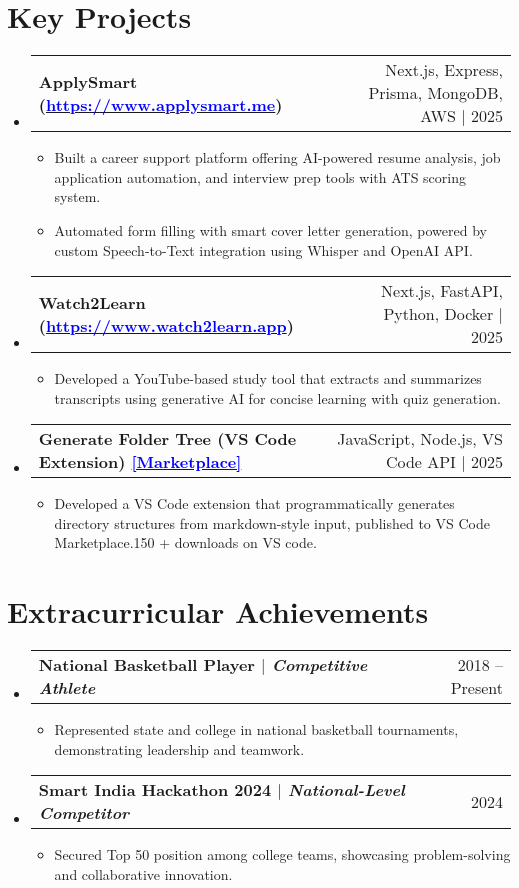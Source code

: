 \documentclass[letterpaper,11pt]{article}
\makeatletter
\newcommand{\resumeItem}[1]{\item\small{#1 \vspace{-3pt}}}
\newcommand{\resumeProjectHeading}[2]{
  \item
  \begin{tabular*}{0.98\textwidth}{l@{\extracolsep{\fill}}r}
    \small\bfseries#1 & \small#2 \\
  \end{tabular*}\vspace{-6pt}
}
\newcommand{\resumeProjectHeadingWithLink}[3]{
  \item
  \begin{tabular*}{0.98\textwidth}{l@{\extracolsep{\fill}}r}
    \small\bfseries#1 (\href{#2}{\textcolor{blue}{#2}}) & \small#3 \\
  \end{tabular*}\vspace{-6pt}
}
\newcommand{\resumeSubHeadingListStart}{\begin{itemize}[leftmargin=0.1in, label={}]}
\newcommand{\resumeSubHeadingListEnd}{\end{itemize}\vspace{-6pt}}
\newcommand{\resumeItemListStart}{\begin{itemize}}
\newcommand{\resumeItemListEnd}{\end{itemize}\vspace{-6pt}}
\makeatother
\begin{document}
\section{Key Projects}
\vspace{-2pt}
\resumeSubHeadingListStart
  \resumeProjectHeadingWithLink{\textbf{ApplySmart}}{https://www.applysmart.me}{Next.js, Express, Prisma, MongoDB, AWS $|$ 2025}
  \resumeItemListStart
    \resumeItem{Built a career support platform offering AI-powered resume analysis, job application automation, and interview prep tools with ATS scoring system.}
    \resumeItem{Automated form filling with smart cover letter generation, powered by custom Speech-to-Text integration using Whisper and OpenAI API.}
  \resumeItemListEnd

  \resumeProjectHeadingWithLink{\textbf{Watch2Learn}}{https://www.watch2learn.app}{Next.js, FastAPI, Python, Docker $|$ 2025}
  \resumeItemListStart
    \resumeItem{Developed a YouTube-based study tool that extracts and summarizes transcripts using generative AI for concise learning with quiz generation.}
  \resumeItemListEnd

\resumeProjectHeading{\textbf{Generate Folder Tree (VS Code Extension)} \href{https://marketplace.visualstudio.com/items?itemName=Suuraw.generate-folder-tree}{\textcolor{blue}{[Marketplace]}}}{JavaScript, Node.js, VS Code API $|$ 2025}
\resumeItemListStart
  \resumeItem{Developed a VS Code extension that programmatically generates directory structures from markdown-style input, published to VS Code Marketplace.150 + downloads on VS code.}
\resumeItemListEnd
\resumeSubHeadingListEnd

\section{Extracurricular Achievements}
\vspace{-2pt}
\resumeSubHeadingListStart
  \resumeProjectHeading{\textbf{National Basketball Player} $|$ \emph{Competitive Athlete}}{2018 -- Present}
  \resumeItemListStart
    \resumeItem{Represented state and college in national basketball tournaments, demonstrating leadership and teamwork.}
  \resumeItemListEnd

  \resumeProjectHeading{\textbf{Smart India Hackathon 2024} $|$ \emph{National-Level Competitor}}{2024}
  \resumeItemListStart
    \resumeItem{Secured Top 50 position among college teams, showcasing problem-solving and collaborative innovation.}
  \resumeItemListEnd
\resumeSubHeadingListEnd
\end{document}
